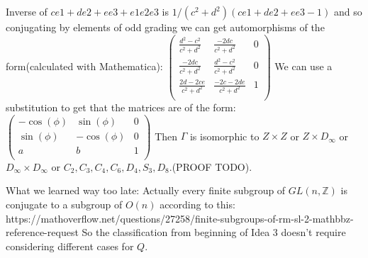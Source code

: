 \documentclass[a4paper]{article}
\begin{document}
Inverse of $c e1+d e2+ e e3+ e1e2e3$ is $1/(c^2+d^2) (c e1 + d e2 + e e3 -1)$ and so conjugating by elements of odd grading we can get automorphisms of the form(calculated with Mathematica):
$\begin{pmatrix}
\frac{d^2-c^2}{c^2+d^2} & \frac{-2 d c}{c^2+d^2} &0 \\ 
\frac{-2 d c}{c^2+d^2} & \frac{d^2-c^2}{c^2+d^2} & 0\\
\frac{2d-2ce}{c^2+d^2} & \frac{-2c-2de}{c^2+d^2} &  1\\
\end{pmatrix}$
We can use a substitution to get that the matrices are of the form:
$\begin{pmatrix}
-\cos(\phi) & \sin(\phi) &0 \\ 
\sin(\phi) & -\cos(\phi) & 0\\
a & b &  1\\
\end{pmatrix}$
Then $\Gamma$ is isomorphic to $Z \times Z$ or $Z \times D_\infty$ or $D_\infty \times D_\infty$ or $C_2, C_3, C_4, C_6, D_4, S_3,D_8$.(PROOF TODO).

What we learned way too late:
Actually every finite subgroup of $GL(n, \mathbb{Z})$ is conjugate to a subgroup of $O(n)$ according to this:
https://mathoverflow.net/questions/27258/finite-subgroups-of-rm-sl-2-mathbbz-reference-request
So the classification from beginning of Idea 3 doesn't require considering different cases for $Q$.
\end{document}
